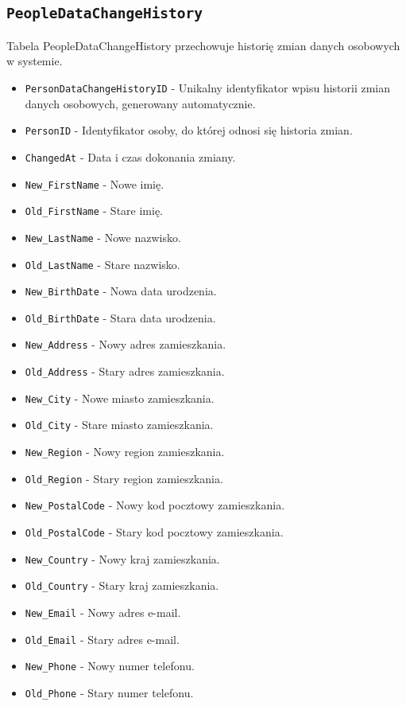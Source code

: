 \documentclass[11pt]{article}
\begin{document}
\subsection{\texttt{PeopleDataChangeHistory}}
\label{sec:orgd02a234}
Tabela PeopleDataChangeHistory przechowuje historię zmian danych osobowych w systemie.
\begin{itemize}
\item \texttt{PersonDataChangeHistoryID} - Unikalny identyfikator wpisu historii zmian danych osobowych, generowany automatycznie.
\item \texttt{PersonID} - Identyfikator osoby, do której odnosi się historia zmian.
\item \texttt{ChangedAt} - Data i czas dokonania zmiany.
\item \texttt{New\_FirstName} - Nowe imię.
\item \texttt{Old\_FirstName} - Stare imię.
\item \texttt{New\_LastName} - Nowe nazwisko.
\item \texttt{Old\_LastName} - Stare nazwisko.
\item \texttt{New\_BirthDate} - Nowa data urodzenia.
\item \texttt{Old\_BirthDate} - Stara data urodzenia.
\item \texttt{New\_Address} - Nowy adres zamieszkania.
\item \texttt{Old\_Address} - Stary adres zamieszkania.
\item \texttt{New\_City} - Nowe miasto zamieszkania.
\item \texttt{Old\_City} - Stare miasto zamieszkania.
\item \texttt{New\_Region} - Nowy region zamieszkania.
\item \texttt{Old\_Region} - Stary region zamieszkania.
\item \texttt{New\_PostalCode} - Nowy kod pocztowy zamieszkania.
\item \texttt{Old\_PostalCode} - Stary kod pocztowy zamieszkania.
\item \texttt{New\_Country} - Nowy kraj zamieszkania.
\item \texttt{Old\_Country} - Stary kraj zamieszkania.
\item \texttt{New\_Email} - Nowy adres e-mail.
\item \texttt{Old\_Email} - Stary adres e-mail.
\item \texttt{New\_Phone} - Nowy numer telefonu.
\item \texttt{Old\_Phone} - Stary numer telefonu.
\end{itemize}
\end{document}

